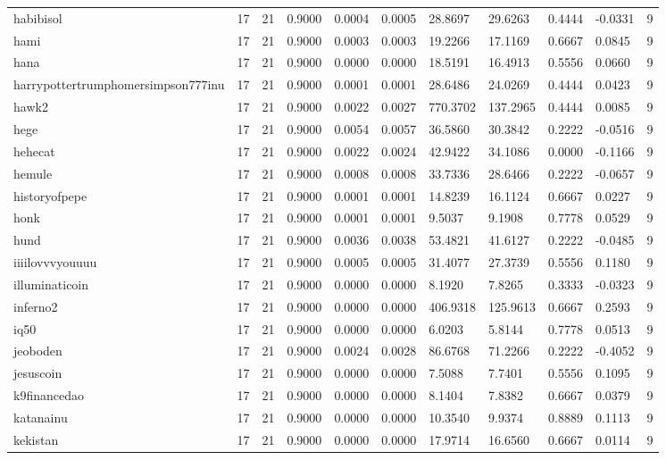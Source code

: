 \begin{table}[htbp]
\begin{tabular}{lllllllllll}
habibisol & 17 & 21 & 0.9000 & 0.0004 & 0.0005 & 28.8697 & 29.6263 & 0.4444 & -0.0331 & 9 \\
hami & 17 & 21 & 0.9000 & 0.0003 & 0.0003 & 19.2266 & 17.1169 & 0.6667 & 0.0845 & 9 \\
hana & 17 & 21 & 0.9000 & 0.0000 & 0.0000 & 18.5191 & 16.4913 & 0.5556 & 0.0660 & 9 \\
harrypottertrumphomersimpson777inu & 17 & 21 & 0.9000 & 0.0001 & 0.0001 & 28.6486 & 24.0269 & 0.4444 & 0.0423 & 9 \\
hawk2 & 17 & 21 & 0.9000 & 0.0022 & 0.0027 & 770.3702 & 137.2965 & 0.4444 & 0.0085 & 9 \\
hege & 17 & 21 & 0.9000 & 0.0054 & 0.0057 & 36.5860 & 30.3842 & 0.2222 & -0.0516 & 9 \\
hehecat & 17 & 21 & 0.9000 & 0.0022 & 0.0024 & 42.9422 & 34.1086 & 0.0000 & -0.1166 & 9 \\
hemule & 17 & 21 & 0.9000 & 0.0008 & 0.0008 & 33.7336 & 28.6466 & 0.2222 & -0.0657 & 9 \\
historyofpepe & 17 & 21 & 0.9000 & 0.0001 & 0.0001 & 14.8239 & 16.1124 & 0.6667 & 0.0227 & 9 \\
honk & 17 & 21 & 0.9000 & 0.0001 & 0.0001 & 9.5037 & 9.1908 & 0.7778 & 0.0529 & 9 \\
hund & 17 & 21 & 0.9000 & 0.0036 & 0.0038 & 53.4821 & 41.6127 & 0.2222 & -0.0485 & 9 \\
iiiilovvvyouuuu & 17 & 21 & 0.9000 & 0.0005 & 0.0005 & 31.4077 & 27.3739 & 0.5556 & 0.1180 & 9 \\
illuminaticoin & 17 & 21 & 0.9000 & 0.0000 & 0.0000 & 8.1920 & 7.8265 & 0.3333 & -0.0323 & 9 \\
inferno2 & 17 & 21 & 0.9000 & 0.0000 & 0.0000 & 406.9318 & 125.9613 & 0.6667 & 0.2593 & 9 \\
iq50 & 17 & 21 & 0.9000 & 0.0000 & 0.0000 & 6.0203 & 5.8144 & 0.7778 & 0.0513 & 9 \\
jeoboden & 17 & 21 & 0.9000 & 0.0024 & 0.0028 & 86.6768 & 71.2266 & 0.2222 & -0.4052 & 9 \\
jesuscoin & 17 & 21 & 0.9000 & 0.0000 & 0.0000 & 7.5088 & 7.7401 & 0.5556 & 0.1095 & 9 \\
k9financedao & 17 & 21 & 0.9000 & 0.0000 & 0.0000 & 8.1404 & 7.8382 & 0.6667 & 0.0379 & 9 \\
katanainu & 17 & 21 & 0.9000 & 0.0000 & 0.0000 & 10.3540 & 9.9374 & 0.8889 & 0.1113 & 9 \\
kekistan & 17 & 21 & 0.9000 & 0.0000 & 0.0000 & 17.9714 & 16.6560 & 0.6667 & 0.0114 & 9 \\

\end{tabular}
\end{table}
